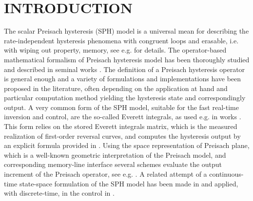 \documentclass[journal]{IEEEtran}
\begin{document}
\IEEEpeerreviewmaketitle






\section{INTRODUCTION}
\label{sec:1}

The scalar Preisach hysteresis (SPH) model is a universal mean for
describing the rate-independent hysteresis phenomena with
congruent loops and erasable, i.e. with wiping out property,
memory, see e.g. \cite{Maye03} for details. The operator-based
mathematical formalism of Preisach hysteresis model has been
thoroughly studied and described in seminal works
\cite{Maye03,Krejci96,Visit94,BrokSprek96}. The definition of a
Preisach hysteresis operator is general enough and a variety of
formulations and implementations have been proposed in the
literature, often depending on the application at hand and
particular computation method yielding the hysteresis state and
correspondingly output. A very common form of the SPH model,
suitable for the fast real-time inversion and control, are the
so-called Everett integrals, as used e.g. in works
\cite{davino2005,davino2008,davino2014}. This form relies on the
stored Everett integrals matrix, which is the measured realization
of first-order reversal curves, and computes the hysteresis output
by an explicit formula provided in \cite{doong1985,mayergoyz1988}.
Using the space representation of Preisach plane, which is a
well-known geometric interpretation of the Preisach model, and
corresponding memory-line interface several schemes evaluate the
output increment of the Preisach operator, see e.g.
\cite{mccarthy2011}. A related attempt of a continuous-time
state-space formulation of the SPH model has been made in
\cite{RudBert11} and applied, with discrete-time, in the control
in \cite{ruderman2014}.
\end{document}
